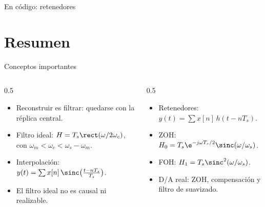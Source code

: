 \documentclass[aspectratio=169,11pt]{beamer}
\begin{document}
\begin{frame}{En código: retenedores}
\end{frame}

\section*{Resumen}
\begin{frame}{Conceptos importantes}
  \begin{columns}[T]
    \begin{column}{0.5\textwidth}
      \begin{itemize}
        \item Reconstruir es filtrar: quedarse con la réplica central.
        \item Filtro ideal: $H=T_s\rect(\omega/2\omega_c)$, con $\omega_m<\omega_c<\omega_s-\omega_m$.
        \item Interpolación: $y(t)=\sum x[n]\,\sinc\big(\frac{t-nT_s}{T_s}\big)$.
        \item El filtro ideal no es causal ni realizable.
      \end{itemize}
    \end{column}
    \begin{column}{0.5\textwidth}
      \begin{itemize}
        \item Retenedores: $y(t)=\sum x[n]\,h(t-nT_s)$.
        \item ZOH: $H_0=T_s\e^{-j\omega T_s/2}\sinc(\omega/\omega_s)$.
        \item FOH: $H_1=T_s\sinc^2(\omega/\omega_s)$.
        \item D/A real: ZOH, compensación y filtro de suavizado.
      \end{itemize}
    \end{column}
  \end{columns}
  \bigskip
\end{frame}
\end{document}
